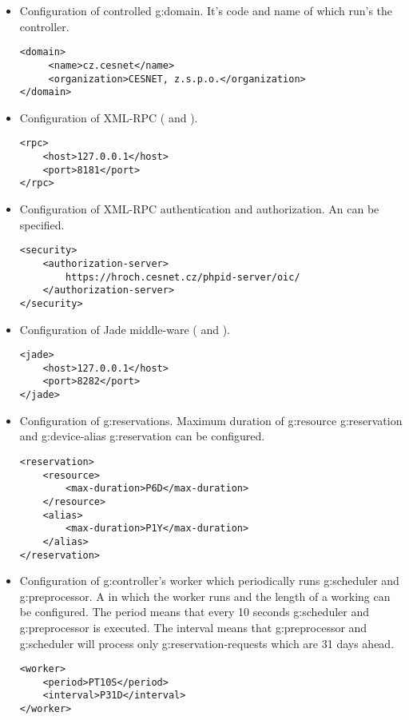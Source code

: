 \begin{itemize}
\item Configuration of controlled \gls{g:domain}. It's code  and name of  which run's the
controller.
\begin{verbatim}
<domain>
     <name>cz.cesnet</name>
     <organization>CESNET, z.s.p.o.</organization>
</domain>
\end{verbatim}

\item Configuration of XML-RPC ( and ).
\begin{verbatim}
<rpc>
    <host>127.0.0.1</host>
    <port>8181</port>
</rpc>
\end{verbatim}

\item Configuration of XML-RPC authentication and authorization. An  can be specified.
\begin{verbatim}
<security>
    <authorization-server>
        https://hroch.cesnet.cz/phpid-server/oic/
    </authorization-server>
</security>
\end{verbatim}

\item Configuration of Jade middle-ware ( and ).
\begin{verbatim}
<jade>
    <host>127.0.0.1</host>
    <port>8282</port>
</jade>
\end{verbatim}

\item Configuration of \glspl{g:reservation}. Maximum duration of \gls{g:resource} \gls{g:reservation} and \gls{g:device-alias} \gls{g:reservation} can be configured.
\begin{verbatim}
<reservation>
    <resource>
        <max-duration>P6D</max-duration>
    </resource>
    <alias>
        <max-duration>P1Y</max-duration>
    </alias>
</reservation>
\end{verbatim}

\item Configuration of \gls{g:controller}'s worker which periodically runs \gls{g:scheduler} and \gls{g:preprocessor}. A  in which the worker runs and the length of a working  can be configured. The  period means that every 10 seconds \gls{g:scheduler} and \gls{g:preprocessor} is executed. The  interval means that \gls{g:preprocessor} and \gls{g:scheduler} will process only \glspl{g:reservation-request} which are 31 days ahead.
\begin{verbatim}
<worker>
    <period>PT10S</period>
    <interval>P31D</interval>
</worker>
\end{verbatim}


\end{itemize}
